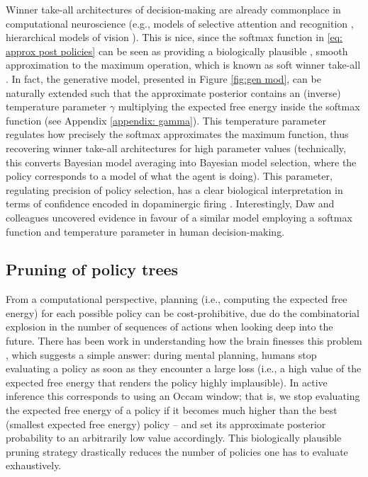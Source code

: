 \documentclass{article}
\begin{document}
Winner take-all architectures of decision-making are already commonplace in computational neuroscience (e.g., models of selective attention and recognition \cite{carpenterMassivelyParallelArchitecture1987,ittiModelSaliencybasedVisual1998}, hierarchical models of vision \cite{riesenhuberHierarchicalModelsObject1999}).
This is nice, since the softmax function in \eqref{eq: approx post policies} can be seen as providing a biologically plausible \cite{marreirosPopulationDynamicsVariance2008,decoDynamicBrainSpiking2008,moranNeuralMassesFields2013}, smooth approximation to the maximum operation, which is known as soft winner take-all \cite{maassComputationalPowerWinnerTakeAll2000}. In fact, the generative model, presented in Figure \ref{fig:gen mod}, can be naturally extended such that the approximate posterior contains an (inverse) temperature parameter $\gamma$ multiplying the expected free energy inside the softmax function (see Appendix \ref{appendix: gamma}). This temperature parameter regulates how precisely the softmax approximates the maximum function, thus recovering winner take-all architectures for high parameter values (technically, this converts Bayesian model averaging into Bayesian model selection, where the policy corresponds to a model of what the agent is doing). This parameter, regulating precision of policy selection, has a clear biological interpretation in terms of confidence encoded in dopaminergic firing \cite{fitzgeraldDopamineRewardLearning2015,fristonAnatomyChoiceDopamine2014,schwartenbeckDopaminergicMidbrainEncodes2015,fristonActiveInferenceProcess2017}. Interestingly, Daw and colleagues \cite{dawCorticalSubstratesExploratory2006} uncovered evidence in favour of a similar model employing a softmax function and temperature parameter in human decision-making.

\subsection{Pruning of policy trees}

From a computational perspective, planning (i.e., computing the expected free energy) for each possible policy can be cost-prohibitive, due do the combinatorial explosion in the number of sequences of actions when looking deep into the future. There has been work in understanding how the brain finesses this problem \cite{huysBonsaiTreesYour2012}, which suggests a simple answer: during mental planning, humans stop evaluating a policy as soon as they encounter a large loss (i.e., a high value of the expected free energy that renders the policy highly implausible). In active inference this corresponds to using an Occam window; that is, we stop evaluating the expected free energy of a policy if it becomes much higher than the best (smallest expected free energy) policy -- and set its approximate posterior probability to an arbitrarily low value accordingly. This biologically plausible pruning strategy drastically reduces the number of policies one has to evaluate exhaustively.
\end{document}
